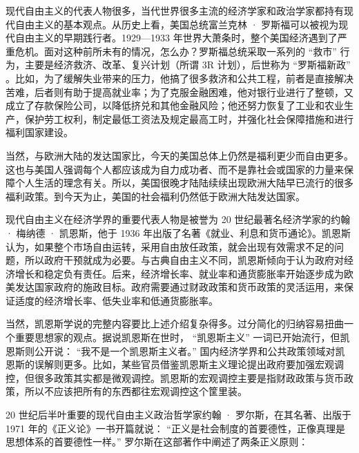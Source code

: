 现代自由主义的代表人物很多，当代世界很多主流的经济学家和政治学家都持有现代自由主义的基本观点。从历史上看，美国总统富兰克林 · 罗斯福可以被视为现代自由主义的早期践行者。1929—1933 年世界大萧条时，整个美国经济遇到了严重危机。面对这种前所未有的情况，怎么办？罗斯福总统采取一系列的 “救市” 行为，主要是经济救济、改革、复兴计划（所谓 3R 计划），后世称为 “罗斯福新政” 。比如，为了缓解失业带来的压力，他搞了很多救济和公共工程，前者是直接解决苦难，后者则有助于提高就业率；为了克服金融困难，他对银行业进行了整顿，又成立了存款保险公司，以降低挤兑和其他金融风险；他还努力恢复了工业和农业生产，保护劳工权利，制定最低工资法及规定最高工时，并强化社会保障措施和进行福利国家建设。

当然，与欧洲大陆的发达国家比，今天的美国总体上仍然是福利更少而自由更多。这也与美国人强调每个人都应该成为自力成功者、而不是靠社会或国家的力量来保障个人生活的理念有关。所以，美国很晚才陆陆续续出现欧洲大陆早已流行的很多福利政策。到今天为止，美国的社会福利仍然低于欧洲大陆发达国家。

现代自由主义在经济学界的重要代表人物是被誉为 20 世纪最著名经济学家的约翰 · 梅纳德 · 凯恩斯，他于 1936 年出版了名著《就业、利息和货币通论》。凯恩斯认为，如果整个市场自由运转，采用自由放任政策，就会出现有效需求不足的问题，所以政府干预就成为必要。与古典自由主义不同，凯恩斯倾向于认为政府对经济增长和稳定负有责任。后来，经济增长率、就业率和通货膨胀率开始逐步成为欧美发达国家政府的施政目标。政府需要通过财政政策和货币政策的灵活运用，来保证适度的经济增长率、低失业率和低通货膨胀率。

当然，凯恩斯学说的完整内容要比上述介绍复杂得多。过分简化的归纳容易扭曲一个重要思想家的观点。据说凯恩斯在世时， “凯恩斯主义” 一词已开始流行，但凯恩斯则公开说： “我不是一个凯恩斯主义者。” 国内经济学界和公共政策领域对凯恩斯的误解则更多。比如，某些官员借鉴凯恩斯主义理论提出政府要加强宏观调控，但很多政策其实都是微观调控。凯恩斯的宏观调控主要是指财政政策与货币政策，所以不应该把所有的东西都往宏观调控这个筐里装。

20 世纪后半叶重要的现代自由主义政治哲学家约翰 · 罗尔斯，在其名著、出版于 1971 年的《正义论》一书开篇就说： “正义是社会制度的首要德性，正像真理是思想体系的首要德性一样。” 罗尔斯在这部著作中阐述了两条正义原则：


